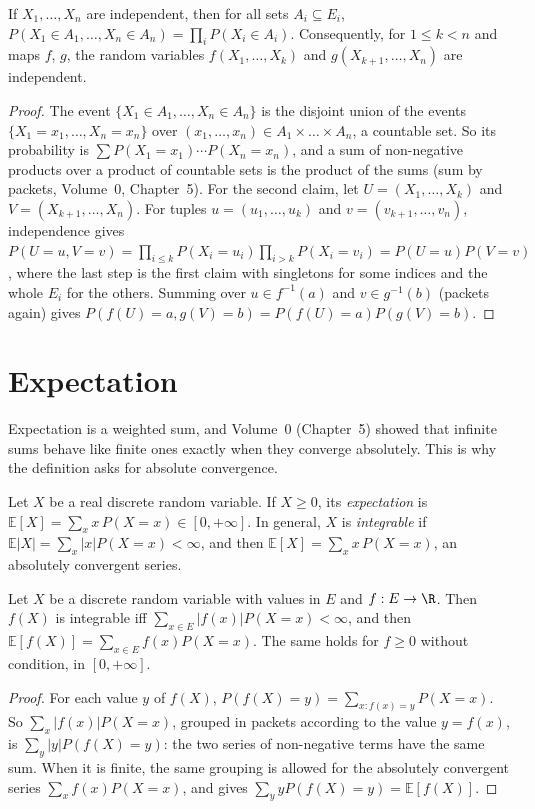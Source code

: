 \begin{proposition}\label{prop:indepfun}
If $X_1,\dots,X_n$ are independent, then for all sets $A_i\subseteq E_i$, $P(X_1\in A_1,\dots,X_n\in A_n)=\prod_iP(X_i\in
A_i)$. Consequently, for $1\le k<n$ and maps $f$, $g$, the random variables $f(X_1,\dots,X_k)$ and $g(X_{k+1},\dots,X_n)$
are independent.
\end{proposition}
\begin{proof}
The event $\{X_1\in A_1,\dots,X_n\in A_n\}$ is the disjoint union of the events $\{X_1=x_1,\dots,X_n=x_n\}$ over
$(x_1,\dots,x_n)\in A_1\times\dots\times A_n$, a countable set. So its probability is
$\sum P(X_1=x_1)\cdots P(X_n=x_n)$, and a sum of non-negative products over a product of countable sets is the
product of the sums (sum by packets, Volume~0, Chapter~5). For the second claim, let $U=(X_1,\dots,X_k)$ and
$V=(X_{k+1},\dots,X_n)$. For tuples $u=(u_1,\dots,u_k)$ and $v=(v_{k+1},\dots,v_n)$, independence gives
$P(U=u,V=v)=\prod_{i\le k}P(X_i=u_i)\prod_{i>k}P(X_i=v_i)=P(U=u)P(V=v)$, where the last step is the first claim with
singletons for some indices and the whole $E_i$ for the others. Summing over $u\in f^{-1}(a)$ and $v\in g^{-1}(b)$ (packets
again) gives $P(f(U)=a,g(V)=b)=P(f(U)=a)P(g(V)=b)$.
\end{proof}

\section{Expectation}

Expectation is a weighted sum, and Volume~0 (Chapter~5) showed that infinite sums behave like finite ones exactly
when they converge absolutely. This is why the definition asks for absolute convergence.

\begin{definition}
Let $X$ be a real discrete random variable. If $X\ge0$, its \emph{expectation} is $\mathbb E[X]=\sum_xx\,P(X=x)\in[0,+\infty]$.
In general, $X$ is \emph{integrable} if $\mathbb E|X|=\sum_x|x|P(X=x)<\infty$, and then
$\mathbb E[X]=\sum_xx\,P(X=x)$, an absolutely convergent series.
\end{definition}

\begin{proposition}\label{prop:transfer}
Let $X$ be a discrete random variable with values in $E$ and $f:E\to\R$. Then $f(X)$ is integrable iff
$\sum_{x\in E}|f(x)|P(X=x)<\infty$, and then $\mathbb E[f(X)]=\sum_{x\in E}f(x)P(X=x)$. The same holds for $f\ge0$
without condition, in $[0,+\infty]$.
\end{proposition}
\begin{proof}
For each value $y$ of $f(X)$, $P(f(X)=y)=\sum_{x:f(x)=y}P(X=x)$. So $\sum_x|f(x)|P(X=x)$, grouped in packets according
to the value $y=f(x)$, is $\sum_y|y|P(f(X)=y)$: the two series of non-negative terms have the same sum. When it is
finite, the same grouping is allowed for the absolutely convergent series $\sum_xf(x)P(X=x)$, and gives
$\sum_yyP(f(X)=y)=\mathbb E[f(X)]$.
\end{proof}

